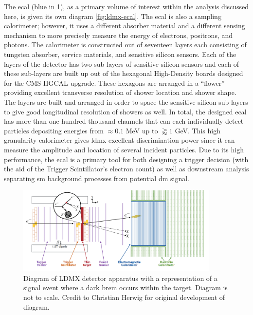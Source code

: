 The \ac{ecal} (blue in \cref{fig:ldmx-det}), as a primary volume of interest within the analysis
discussed here, is given its own diagram \cref{fig:ldmx-ecal}. The \ac{ecal} is also a sampling
calorimeter; however, it uses a different absorber material and a different sensing mechanism to
more precisely measure the energy of electrons, positrons, and photons. The calorimeter is constructed
out of seventeen layers each consisting of tungsten absorber, service materials, and sensitive silicon
sensors. Each of the layers of the detector has two sub-layers of sensitive silicon sensors and each
of these sub-layers are built up out of the hexagonal High-Density boards designed for the CMS
HGCAL upgrade. These hexagons are arranged in a ``flower''
providing excellent transverse resolution of shower location and shower shape. The layers are built
and arranged in order to space the sensitive silicon sub-layers to give good longitudinal resolution
of showers as well. In total, the designed \ac{ecal} has more than one hundred thousand channels that
can each individually detect particles depositing energies from $\approx 0.1$ MeV up to $\gtrapprox 1$ GeV.
This high granularity calorimeter gives \ac{ldmx} excellent discrimination power
since it can measure the amplitude and location of several incident particles.
Due to its high performance, the \ac{ecal} is a primary tool for
both designing a trigger decision (with the aid of the Trigger Scintillator's electron count) as well
as downstream analysis separating \ac{sm} background processes from potential \ac{dm} signal.

\begin{figure}
  \centering
  \includegraphics[width=0.9\textwidth]{figures/ldmx/experiment/detector.png}
  \caption{
    Diagram of LDMX detector apparatus with a representation of a signal event where
    a dark brem occurs within the target. Diagram is not to scale. Credit to Christian Herwig
    for original development of diagram.
  }
  \label{fig:ldmx-det}
\end{figure}

